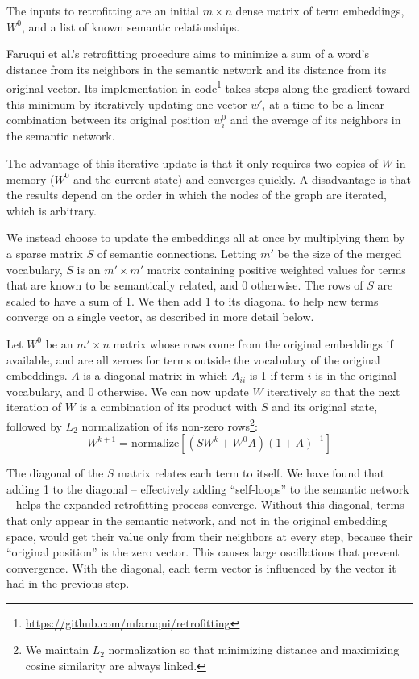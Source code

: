 \documentclass[11pt,letterpaper]{article}
\begin{document}
The inputs to retrofitting are an initial $m \times n$ dense matrix of term
embeddings, $W^0$, and a list of known semantic relationships.

Faruqui et al.'s retrofitting procedure aims to minimize a sum of
a word's distance from its neighbors in the semantic network and its distance
from its original vector. Its implementation in code\footnote{
    \url{https://github.com/mfaruqui/retrofitting}
} takes steps along the gradient toward this minimum
by iteratively updating one vector $w'_i$ at a time to be a linear
combination between its original position $w^0_i$ and the average of its neighbors
in the semantic network.

The advantage of this iterative update is that it only requires two copies of
$W$ in memory ($W^0$ and the current state) and converges quickly. A disadvantage
is that the results depend on the order in which the nodes of the graph are
iterated, which is arbitrary.

We instead choose to update the embeddings all at once by multiplying them by a
sparse matrix $S$ of semantic connections. Letting $m'$ be the size of the
merged vocabulary, $S$ is an $m' \times m'$ matrix containing positive weighted
values for terms that are known to be semantically related, and 0 otherwise.
The rows of $S$ are scaled to have a sum of 1. We then add 1 to its diagonal to
help new terms converge on a single vector, as described in more detail below.

Let $W^0$ be an $m' \times n$ matrix whose rows come from the original
embeddings if available, and are all zeroes for terms outside the vocabulary of
the original embeddings. $A$ is a diagonal matrix in which $A_{ii}$ is 1 if term
$i$ is in the original vocabulary, and 0 otherwise. We can now update $W$
iteratively so that the next iteration of $W$ is a combination of its product
with $S$ and its original state, followed by $L_2$ normalization of its
non-zero rows\footnote{
    We maintain $L_2$ normalization so that minimizing distance and maximizing
    cosine similarity are always linked.
}:
$$
W^{k+1} = \mathrm{normalize}\left[ \left( S W^k + W^0 A \right)\left( 1 + A \right)^{-1} \right]
$$

The diagonal of the $S$ matrix relates each term to itself. We have found that
adding 1 to the diagonal -- effectively adding ``self-loops'' to the semantic
network -- helps the expanded retrofitting process converge.  Without this
diagonal, terms that only appear in the semantic network, and not in the
original embedding space, would get their value only from their neighbors at
every step, because their ``original position'' is the zero vector. This causes
large oscillations that prevent convergence.  With the diagonal, each term
vector is influenced by the vector it had in the previous step.
\end{document}
